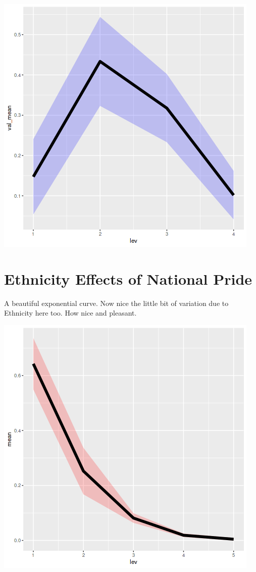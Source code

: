 \documentclass{amsart}
\begin{document}
\includegraphics[scale=0.8]{resphr.png}

\section{Ethnicity Effects of National Pride}

A beautiful exponential curve. Now nice the little bit of variation due to Ethnicity here too.  How nice and pleasant.

\includegraphics[scale=0.8]{natpride.png}
\end{document}
